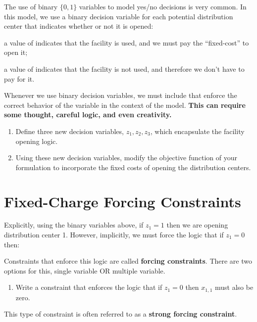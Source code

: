 \documentclass[11pt]{article}
\theoremstyle{definition}
\newcommand{\answerbox}[3]{%
  \fbox{%
    \begin{minipage}[#1]{#2}
      \hfill\vspace{#3}
    \end{minipage}
  }
}
\newcommand{\wordbox}{\answerbox{c}{1.2in}{.5cm}}
\newcommand{\letterbox}{\answerbox{c}{.7cm}{.5cm}}
\begin{document}
The use of binary $\{0,1\}$ variables to model yes/no decisions is very common.  In this model, we use a binary decision variable for each potential distribution center that indicates whether or not it is opened:

a value of \letterbox indicates that the facility is used, and we must pay the ``fixed-cost'' to open it;

a value of \letterbox indicates that the facility is not used, and therefore we don't have to pay for it.



Whenever we use binary decision variables, we must include \wordbox that enforce the correct behavior of the variable in the context of the model.  \textbf{This can require some thought, careful logic, and even creativity.}  
\newpage

\begin{enumerate}
\item Define three new decision variables, $z_1, z_2, z_3$, which encapsulate the facility opening logic. \vspace{1in}
\item Using these new decision variables, modify the objective function of your formulation to incorporate the fixed costs of opening the distribution centers. \vspace{1in}
\end{enumerate}


\section{Fixed-Charge Forcing Constraints}

Explicitly, using the binary variables above, if $z_1 = 1$ then we are opening distribution center 1. However, implicitly, we must force the logic that if $z_1 = 0$ then: \vspace{1cm}


Constraints that enforce this logic are called \textbf{forcing constraints}. There are two options for this, single variable OR multiple variable.


\begin{enumerate}[resume]
\item Write a constraint that enforces the logic that if $z_1 = 0$ then $x_{1,1}$ must also be zero. \vspace{2in}
\end{enumerate}

This type of constraint is often referred to as a \textbf{strong forcing constraint}.
\end{document}
